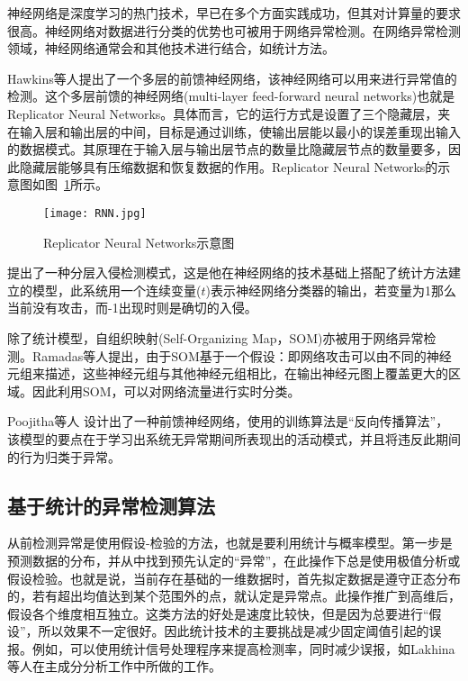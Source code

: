 神经网络是深度学习的热门技术，早已在多个方面实践成功，但其对计算量的要求很高。神经网络对数据进行分类的优势也可被用于网络异常检测。在网络异常检测领域，神经网络通常会和其他技术进行结合，如统计方法。


Hawkins等人\cite{hawk2002Outlier}提出了一个多层的前馈神经网络，该神经网络可以用来进行异常值的检测。这个多层前馈的神经网络(multi-layer feed-forward neural networks)也就是Replicator Neural Networks。具体而言，它的运行方式是设置了三个隐藏层，夹在输入层和输出层的中间，目标是通过训练，使输出层能以最小的误差重现出输入的数据模式。其原理在于输入层与输出层节点的数量比隐藏层节点的数量要多，因此隐藏层能够具有压缩数据和恢复数据的作用。Replicator Neural Networks的示意图如图~\ref{fig:rnn}所示。


\begin{figure}
    \centering
    \texttt{[image: RNN.jpg]}
    \caption{Replicator Neural Networks示意图}
    \label{fig:rnn}
  \end{figure}

  \citet{2001HIDE} 提出了一种分层入侵检测模式，这是他在神经网络的技术基础上搭配了统计方法建立的模型，此系统用一个连续变量($t$)表示神经网络分类器的输出，若变量为1那么当前没有攻击，而-1出现时则是确切的入侵。
  
  除了统计模型，自组织映射(Self-Organizing Map，SOM)亦被用于网络异常检测。Ramadas等人\cite{2003Detecting}提出，由于SOM基于一个假设：即网络攻击可以由不同的神经元组来描述，这些神经元组与其他神经元组相比，在输出神经元图上覆盖更大的区域。因此利用SOM，可以对网络流量进行实时分类。
  
  Poojitha等人\cite{Poojitha2010} 设计出了一种前馈神经网络，使用的训练算法是“反向传播算法”，该模型的要点在于学习出系统无异常期间所表现出的活动模式，并且将违反此期间的行为归类于异常。

\subsection{基于统计的异常检测算法}
从前检测异常是使用假设-检验的方法，也就是要利用统计与概率模型。第一步是预测数据的分布，并从中找到预先认定的“异常”，在此操作下总是使用极值分析或假设检验。也就是说，当前存在基础的一维数据时，首先拟定数据是遵守正态分布的，若有超出均值达到某个范围外的点，就认定是异常点。此操作推广到高维后，假设各个维度相互独立。这类方法的好处是速度比较快，但是因为总要进行“假设”，所以效果不一定很好。因此统计技术的主要挑战是减少固定阈值引起的误报\cite{cormode2010algorithms}。例如，可以使用统计信号处理程序来提高检测率，同时减少误报，如Lakhina等人在主成分分析工作中所做的工作\cite{lakhina2004diagnosing,lakhina2004structural,lakhina2005mining}。

